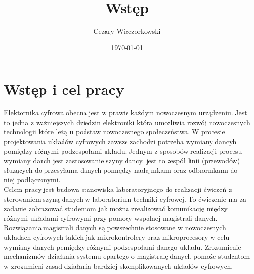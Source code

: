 \documentclass[../main.tex]{subfiles}
\author{Cezary Wieczorkowski}
\date{\today}
\title{Wstęp}
\begin{document}
\section{Wstęp i cel pracy}

Elektornika cyfrowa obecna jest w prawie każdym nowoczesnym urządzeniu. Jest to jedna z ważniejszych dziedzin elektroniki 
która umożliwia rozwój nowoczesnych technologii które leżą u podstaw nowoczesnego społeczeństwa. W procesie projektowania układów cyfrowych
zawsze zachodzi potrzeba wymiany dancyh pomiędzy różnymi podzespołami układu. Jednym z sposobów realizacji procesu wymiany danch jest zastosowanie
szyny dancy. jest to zespół linii (przewodów) służących do przesyłania danych pomiędzy nadajnikami oraz odbiornikami do niej podłączonymi. 
\\  
Celem pracy jest budowa stanowiska laboratoryjnego do realizacji ćwiczeń z sterowaniem szyną danych w laboratorium techniki cyfrowej.
To ćwiczenie ma za zadanie zobrazować studentom jak można zrealizować komunikację między różnymi układami cyfrowymi przy pomocy
wspólnej magistrali danych. Rozwiązania magistrali danych są powszechnie stosowane w nowoczesnych układach cyfrowych takich jak mikrokontrolery oraz
mikroprocesory w celu wymiany danych pomiędzy różnymi podzespołami danego układu. Zrozumienie mechanizmów działania systemu opartego o 
magistralę danych pomoże studentom w zrozumieni zasad działania bardziej skomplikowanych układów cyfrowych.
\end{document}
